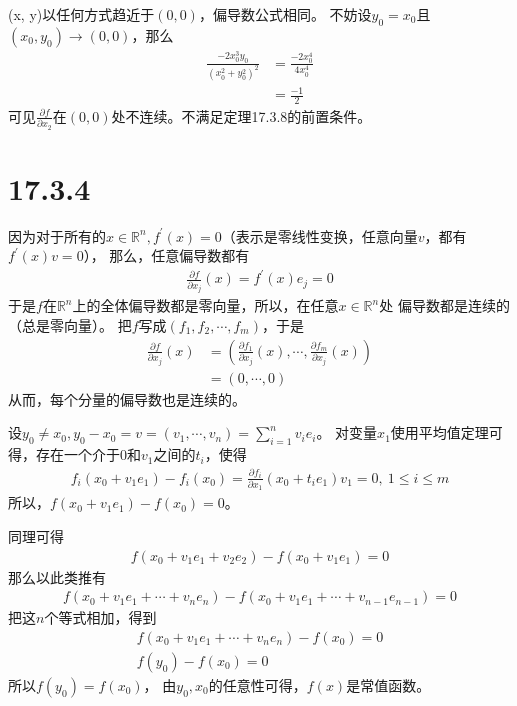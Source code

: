 \documentclass{article}
\begin{document}
\begin{itemize}
        (x, y)以任何方式趋近于$(0, 0)$，偏导数公式相同。
        不妨设$y_0 = x_0$且$(x_0, y_0) \to (0, 0)$，那么
        \begin{align*}
          \frac{- 2x_0^3 y_0}{(x_0^2 + y_0^2)^2}
           & = \frac{- 2x_0^4}{4x_0^4} \\
           & = \frac{- 1}{2}
        \end{align*}
        可见$\frac{\partial f}{\partial x_2}$在$(0, 0)$处不连续。不满足定理17.3.8的前置条件。

\end{itemize}

\section*{17.3.4}

因为对于所有的$x \in \mathbb{R}^n, f^\prime(x) = 0$（表示是零线性变换，任意向量$v$，都有$f^\prime(x)v = 0$），
那么，任意偏导数都有
\begin{align*}
  \frac{\partial f}{\partial x_j}(x) = f^\prime(x) e_j = 0
\end{align*}
于是$f$在$\mathbb{R}^n$上的全体偏导数都是零向量，所以，在任意$x \in \mathbb{R}^n$处
偏导数都是连续的（总是零向量）。
把$f$写成$(f_1, f_2, \cdots, f_m)$，于是
\begin{align*}
  \frac{\partial f}{\partial x_j}(x)
   & = (\frac{\partial f_1}{\partial x_j}(x), \cdots, \frac{\partial f_m}{\partial x_j}(x)) \\
   & = (0, \cdots, 0)
\end{align*}
从而，每个分量的偏导数也是连续的。

设$y_0 \neq x_0, y_0 - x_0 = v = (v_1, \cdots, v_n) = \sum \limits_{i=1}^n v_i e_i$。
对变量$x_1$使用平均值定理可得，存在一个介于$0$和$v_1$之间的$t_i$，使得
\begin{align*}
  f_i(x_0 + v_1e_1) - f_i(x_0) = \frac{\partial f_i}{\partial x_1}(x_0 + t_ie_1)v_1 = 0,\ 1 \leq i \leq m
\end{align*}
所以，$f(x_0 + v_1e_1) - f(x_0) = 0$。

同理可得
\begin{align*}
  f(x_0 + v_1e_1 + v_2e_2) - f(x_0 + v_1e_1) = 0
\end{align*}
那么以此类推有
\begin{align*}
  f(x_0 + v_1e_1 + \cdots + v_ne_n) - f(x_0 + v_1e_1 + \cdots + v_{n-1}e_{n - 1}) = 0
\end{align*}
把这$n$个等式相加，得到
\begin{align*}
  f(x_0 + v_1e_1 + \cdots + v_ne_n) - f(x_0) = 0 \\
  f(y_0) - f(x_0) = 0
\end{align*}
所以$f(y_0) = f(x_0)$，
由$y_0, x_0$的任意性可得，$f(x)$是常值函数。
\end{document}
